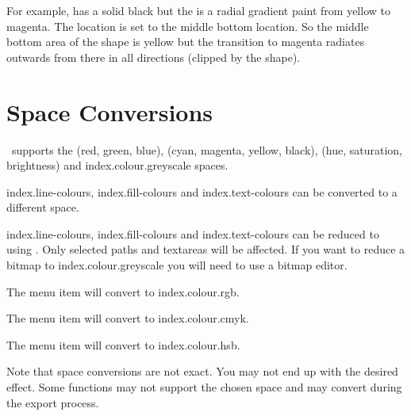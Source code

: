 For example,  has a solid black
 but the  is a radial
gradient paint from yellow to magenta. The location is set to the
middle bottom location. So the middle bottom area of the \gls{shape}
is yellow but the transition to magenta radiates outwards from there
in all directions (clipped by the shape).


\section{ Space Conversions}\label{sec:convertcolspace}


\FlowframTk\ supports the
 (red, green, blue),
 (cyan, magenta, yellow, black),
 (hue, saturation, brightness) and
\gls{index.colour.greyscale}  spaces.

\Glspl{index.line-colour}, \glspl{index.fill-colour} and
\glspl{index.text-colour} can be converted to a different
 space.


\Glspl{index.line-colour}, \glspl{index.fill-colour} and
\glspl{index.text-colour} can be reduced to
 using
.  Only selected \glspl{path} and
\glspl{textarea} will be affected. If you want to reduce a
\gls{bitmap} to \gls{index.colour.greyscale} you will need to use a
bitmap editor.


The  menu item will convert to
\gls{index.colour.rgb}.


The  menu item will convert to
\gls{index.colour.cmyk}.


The  menu item will convert to
\gls{index.colour.hsb}.

\begin{warning}
Note that  space conversions are not exact. You may
not end up with the desired effect. Some  functions
may not support the chosen  space and may convert
during the export process.
\end{warning}

